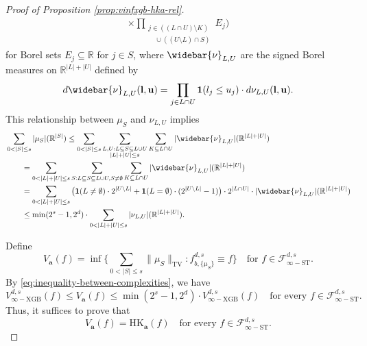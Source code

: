 \documentclass[10pt]{article}
\newcommand{\R}{{\mathbb R}}
\newcommand{\fstinf}{{\mathcal{F}^{d, s}_{\infty-\text{ST}}}}
\newcommand{\vinfxgb}{{V^{d, s}_{\infty-\text{XGB}}}}
\newcommand{\hk}{{\text{HK}}}
\newcommand{\lbf}{{\mathbf{l}}}
\newcommand{\ubf}{{\mathbf{u}}}
\newcommand{\abf}{{\mathbf{a}}}
\newcommand{\ind}{{\mathbf{1}}}
\begin{document}
\begin{proof}[Proof of Proposition \ref{prop:vinfxgb-hka-rel}]
\begin{align}
    \times \prod_{\substack{j \in ((L \cap U) \setminus K) \\
    \quad \cup ((U \setminus L) \cap S)}} E_j\Big) \nonumber 
\end{align}
for Borel sets $E_j \subseteq \R$ for $j \in S$, 
where $\widebar{\nu}_{L, U}$ are the signed Borel measures on 
$\R^{|L| + |U|}$ defined by
\begin{equation*}
    d\widebar{\nu}_{L, U}(\lbf, \ubf) 
    = \prod_{j \in L \cap U} \ind(l_j \le u_j) 
    \cdot d\nu_{L, U}(\lbf, \ubf).
\end{equation*}
This relationship between $\mu_S$ and $\nu_{L, U}$ implies
\begin{align}\label{eq:inequality-between-complexities}
    &\sum_{0 < |S| \le s} |\mu_S|(\R^{|S|}) 
    \le \sum_{0 < |S| \le s} 
    \sum_{\substack{L, U: L \subseteq S \subseteq L \cup U \\
    |L| + |U| \le s}}
    \sum_{K \subseteq L \cap U} 
    |\widebar{\nu}_{L, U}|(\R^{|L| + |U|}) \nonumber \\
    &\qquad= \sum_{0 < |L| + |U| \le s}
    \sum_{S: L \subseteq S \subseteq L \cup U, S \neq \emptyset}
    \sum_{K \subseteq L \cap U} 
    |\widebar{\nu}_{L, U}|(\R^{|L| + |U|}) \nonumber \\
    &\qquad= \sum_{0 < |L| + |U| \le s}
    \big(\ind(L \neq \emptyset) \cdot 2^{|U \setminus L|} 
    + \ind(L = \emptyset) \cdot (2^{|U \setminus L|} - 1)\big) 
    \cdot 2^{|L \cap U|} \cdot
    |\widebar{\nu}_{L, U}|(\R^{|L| + |U|}) \nonumber \\
    &\qquad\le \min(2^s - 1, 2^d) \cdot
    \sum_{0 < |L| + |U| \le s}
    |\nu_{L, U}|(\R^{|L| + |U|}).
\end{align}

Define 
\begin{equation}\label{eq:va-def}
    V_{\abf}(f) = \inf \Big\{ 
    \sum_{0 < |S| \le s} \|\mu_S\|_{\text{TV}}: 
    f^{d, s}_{b, \{\mu_S\}} \equiv f \Big\} 
    \quad \text{for } f \in \fstinf.
\end{equation}
By \eqref{eq:inequality-between-complexities}, we have
\begin{equation*}
    \vinfxgb(f) \le V_{\abf}(f) 
    \le \min(2^s - 1, 2^d) \cdot \vinfxgb(f)
    \quad \text{for every } f \in \fstinf.
\end{equation*}
Thus, it suffices to prove that  
\begin{equation*}
    V_{\abf}(f) = \hk_{\abf}(f)
    \quad \text{for every } f \in \fstinf.
\end{equation*}


\end{proof}
\end{document}
